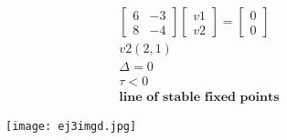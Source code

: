 \documentclass[a4paper,10pt]{article}
\begin{document}
\begin{enumerate}
\begin{enumerate}
\begin{equation}
\begin{aligned}
\begin{bmatrix}
                            6 & -3\\
                            8&-4
                        \end{bmatrix}
                        \begin{bmatrix}
                            v1\\
                            v2
                        \end{bmatrix}
                        =
                        \begin{bmatrix}
                            0\\
                            0
                        \end{bmatrix}\\
                        v2(2,1)\\
                        \Delta=0\\
                        \tau<0\\
                        \textbf{line of stable fixed points}
                    \end{aligned}
                \end{equation}
                \newpage
                \begin{figure}[h]
                    \centering
                    \texttt{[image: ej3imgd.jpg]}
                    \label{fig:mesh1}
                \end{figure}
        \end{enumerate}
        

\end{enumerate}
\end{document}

